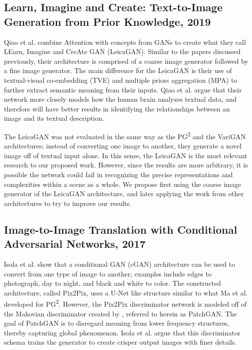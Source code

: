 \documentclass{article}
\begin{document}
\subsection*{Learn, Imagine and Create: Text-to-Image Generation from Prior Knowledge, 2019}
\nocite{leica}
Qiao et al. combine Attention with concepts from GANs to create what they call
LEarn, Imagine and CreAte GAN (LeicaGAN). Similar to the papers discussed
previously, their architecture is comprised of a coarse image generator followed
by a fine image generator. The main difference for the LeicaGAN is their use
of textual-visual co-embedding (TVE) and multiple priors aggregation (MPA)
to further extract semantic meaning from their inputs. Qiao et al. argue that
their network more closely models how the human brain analyzes textual data,
and therefore will have better results in identifying the relationships between
an image and its textual description.

The LeicaGAN was not evaluated in the same way as the PG\textsuperscript{2} and
the VariGAN architectures; instead of converting one image to another, they
generate a novel image off of textual input alone. In this sense, the LeicaGAN
is the most relevant research to our proposed work. However, since the results
are more arbitrary, it is possible the network could fail in recognizing the
precise representations and complexities within a scene as a whole.
We propose first using the coarse image generator of the LeicaGAN architecture,
and later applying the work from other architectures to try to improve
our results.

\subsection*{Image-to-Image Translation with Conditional Adversarial Networks, 2017}
\nocite{pix2pix}
Isola et al. show that a conditional GAN (cGAN) architecture can be used to
convert from one type of image to another; examples include edges to photograph,
day to night, and black and white to color. The constructed architecture, called
Pix2Pix, uses a U-Net like structure similar to what Ma et al. developed for
PG\textsuperscript{2}. However, the Pix2Pix discriminator network is modeled off
of the Makovian discriminator created by \cite{markovian},
referred to herein as PatchGAN.
The goal of PatchGAN is to disregard meaning from lower frequency structures,
thereby capturing global phenomenon. Isola et al. argue that this discriminator
schema trains the generator to create crisper output images with finer details.
\end{document}
